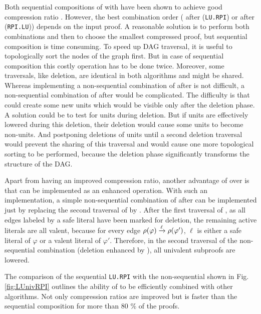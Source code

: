\documentclass{easychair}
\begin{document}
Both sequential compositions of {\LowerUnits} with {\RPI} have been shown to achieve good
compression ratio \cite{LURPI}. However, the best combination order ({\LowerUnits} after
{\RPI} (\texttt{LU.RPI}) or {\RPI} after {\LowerUnits} (\texttt{RPI.LU})) depends on the input proof. A reasonable solution is to perform both combinations and then to choose the smallest
compressed proof, but sequential composition is time consuming. To speed up DAG traversal, it is useful to topologically sort the nodes of the graph first. But in case of sequential composition this costly operation has to be done twice. Moreover, some traversals, like deletion, are identical in both algorithms and might be shared. Whereas implementing a non-sequential combination of {\RPI} after {\LowerUnits} is not difficult, a non-sequential combination of {\LowerUnits} after {\RPI} would be complicated. 
The difficulty is that {\RPI} could create some new units which would be visible only after the deletion
phase.  A solution could be to test for units during deletion. But if units are
effectively lowered during this deletion, their deletion would cause some units to become non-units.
And postponing deletions of units until a second deletion traversal would prevent the sharing of
this traversal and would cause one more topological sorting to be performed, because the deletion phase significantly transforms the structure of the DAG.

Apart from having an improved compression ratio, another advantage of {\LowerUnivalents} over
{\LowerUnits} is that {\LowerUnivalents} can be implemented as an enhanced 
operation. With such an implementation, a simple non-sequential combination of {\LowerUnivalents}
after {\RPI} can be implemented just by replacing the second traversal of {\RPI} by
{\LowerUnivalents}. After the first traversal of {\RPI}, as all edges labeled by a safe literal have been marked for deletion, the remaining active literals are all valent, because for every edge $\rho(\varphi) \xrightarrow{\ell} \rho(\varphi')$, $\ell$ is either a safe literal
of $\varphi$ or a valent literal of $\varphi'$.  Therefore, in the second traversal of the non-sequential combination (deletion enhanced by {\LowerUnivalents}), all univalent subproofs are lowered.

The comparison of the sequential \texttt{LU.RPI} with the non-sequential {\LUnivRPI} shown in Fig.
\ref{fig:LUnivRPI} outlines the ability of {\LowerUnivalents} to be efficiently combined with other
algorithms. Not only compression ratios are improved but {\LUnivRPI} is faster than the sequential
composition for more than 80 \% of the proofs.



\end{document}

